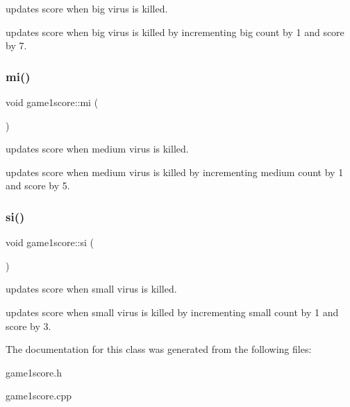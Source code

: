 updates score when big virus is killed. 

updates score when big virus is killed by incrementing big count by 1 and score by 7. \mbox{\label{classgame1score_a7b29421704c3766a8535fa878b3036d9}} 
\subsubsection{\texorpdfstring{mi()}{mi()}}
{\footnotesize\ttfamily void game1score\+::mi (\begin{DoxyParamCaption}{ }\end{DoxyParamCaption})}



updates score when medium virus is killed. 

updates score when medium virus is killed by incrementing medium count by 1 and score by 5. \mbox{\label{classgame1score_a8e7db583a40c885711eae334d4c695cd}} 
\subsubsection{\texorpdfstring{si()}{si()}}
{\footnotesize\ttfamily void game1score\+::si (\begin{DoxyParamCaption}{ }\end{DoxyParamCaption})}



updates score when small virus is killed. 

updates score when small virus is killed by incrementing small count by 1 and score by 3. 

The documentation for this class was generated from the following files\+:\begin{DoxyCompactItemize}
\item 
game1score.\+h\item 
game1score.\+cpp\end{DoxyCompactItemize}
